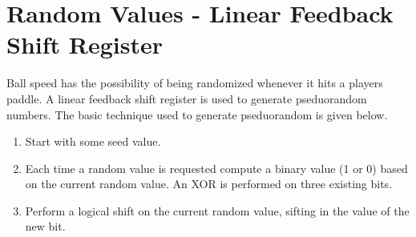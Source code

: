 \section{Random Values - Linear Feedback Shift Register} 
\label{sec:random}

Ball speed has the possibility of being randomized whenever it hits a players paddle.
A linear feedback shift register is used to generate pseduorandom numbers.
The basic technique used to generate pseduorandom is given below.

\begin{enumerate}
\item Start with some seed value.
\item Each time a random value is requested compute a binary value (1 or 0) based on the current random value. An XOR is performed on three existing bits. %
\item Perform a logical shift on the current random value, sifting in the value of the new bit.
\end{enumerate}
